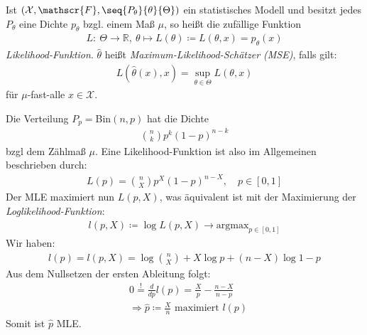 \documentclass[a4paper]{scrartcl}
\begin{document}
		\begin{definition}
			Ist $(\mathcal{X},\mathscr{F},\seq{P_\theta}{\theta}{\Theta})$ ein statistisches Modell und besitzt jedes $P_\theta$ eine Dichte $p_\theta$ bzgl. einem Maß $\mu$, so heißt die zufällige Funktion
			\begin{align*}
				L\colon~\Theta\to\mathbb{R},~\theta\mapsto L(\theta)\coloneq L(\theta,x)=p_\theta(x)
			\end{align*}
			\emph{Likelihood-Funktion}. $\hat{\theta}$ heißt \emph{Maximum-Likelihood-Schätzer (MSE)}, falls gilt:
			\begin{align*}
				L(\hat{\theta}(x),x)=\sup_{\theta\in\Theta}L(\theta,x)
			\end{align*}
			für $\mu$-fast-alle $x\in\mathcal{X}$.
		\end{definition}
		\begin{example}
			Die Verteilung $P_p=$Bin$(n,p)$ hat die Dichte
			\begin{align*}
				\binom{n}{k}p^k(1-p)^{n-k}
			\end{align*}
			bzgl dem Zählmaß $\mu$. Eine Likelihood-Funktion ist also im Allgemeinen beschrieben durch:
			\begin{align*}
				L(p)=\binom{n}{X}p^X(1-p)^{n-X},\quad p\in[0,1]
			\end{align*}
			Der MLE maximiert nun $L(p,X)$, was äquivalent ist mit der Maximierung der \emph{Loglikelihood-Funktion}:
			\begin{align*}
				l(p,X)\coloneq \log{L(p,X)}\rightarrow \text{argmax}_{p\in[0,1]}
			\end{align*}
			Wir haben:
			\begin{align*}
				l(p)=l(p,X)=\log{\binom{n}{X}}+X\log{p}+(n-X)\log{1-p}
			\end{align*}
			Aus dem Nullsetzen der ersten Ableitung folgt:
			\begin{align*}
				&0\overset{!}{=}\frac{d}{dp}l(p)=\frac{X}{p}-\frac{n-X}{n-p}\\
				&\Rightarrow \hat{p}\coloneq \frac{X}{n}\text{ maximiert }l(p)
			\end{align*}
			Somit ist $\hat{p}$ MLE.
		\end{example}
\end{document}

